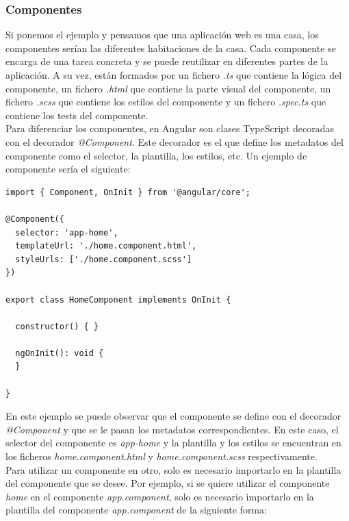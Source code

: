 \newpage

\subsubsection{Componentes}\label{subsubsec:componentes}

Si ponemos el ejemplo y pensamos que una aplicación web es una casa, los componentes serían las diferentes habitaciones de la casa. Cada componente
se encarga de una tarea concreta y se puede reutilizar en diferentes partes de la aplicación. A su vez, están formados por un fichero \textit{.ts}
que contiene la lógica del componente, un fichero \textit{.html} que contiene la parte visual del componente, un fichero \textit{.scss}
que contiene los estilos del componente y un fichero \textit{.spec.ts} que contiene los tests del componente. \\

Para diferenciar los componentes, en Angular son clases TypeScript decoradas con el decorador \textit{@Component}. Este decorador
es el que define los metadatos del componente como el selector, la plantilla, los estilos, etc. Un ejemplo de componente sería el siguiente:

\begin{lstlisting}
import { Component, OnInit } from '@angular/core';

@Component({
  selector: 'app-home',
  templateUrl: './home.component.html',
  styleUrls: ['./home.component.scss']
})

export class HomeComponent implements OnInit {

  constructor() { }

  ngOnInit(): void {
  }

}
\end{lstlisting}

En este ejemplo se puede observar que el componente se define con el decorador \textit{@Component} y que se le pasan los metadatos
correspondientes. En este caso, el selector del componente es \textit{app-home} y la plantilla y los estilos se encuentran en los ficheros
\textit{home.component.html} y \textit{home.component.scss} respectivamente. \\

Para utilizar un componente en otro, solo es necesario importarlo en la plantilla del componente que se desee. Por ejemplo, si se quiere
utilizar el componente \textit{home} en el componente \textit{app.component}, solo es necesario importarlo en la plantilla del componente
\textit{app.component} de la siguiente forma:

